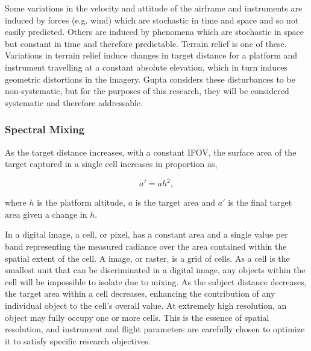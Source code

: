 \documentclass[10pt]{article}
\begin{document}
Some variations in the velocity and attitude of the airframe and instruments are induced by forces (e.g. wind) which are stochastic in time and space and so not easily predicted. Others are induced by phenomena which are stochastic in space but constant in time and therefore predictable. Terrain relief is one of these. Variations in terrain relief induce changes in target distance for a platform and instrument travelling at a constant absolute elevation, which in turn induces geometric distortions in the imagery. Gupta \cite{Gupta2018} considers these disturbances to be non-systematic, but for the purposes of this research, they will be considered systematic and therefore addressable.

\subsubsection*{Spectral Mixing}

As the target distance increases, with a constant IFOV, the surface area of the target captured in a single cell increases in proportion as, 

\begin{equation}
a\prime = a h^2,
\end{equation}

where $h$ is the platform altitude, $a$ is the target area and $a\prime$ is the final target area given a change in $h$. 

In a digital image, a cell, or pixel, has a constant area and a single value per band representing the measured radiance over the area contained within the spatial extent of the cell. A image, or raster, is a grid of cells. As a cell is the smallest unit that can be discriminated in a digital image, any objects within the cell will be impossible to isolate due to mixing. As the subject distance decreases, the target area within a cell decreases, enhancing the contribution of any individual object to the cell's overall value. At extremely high resolution, an object may fully occupy one or more cells. This is the essence of spatial resolution, and instrument and flight parameters are carefully chosen to optimize it to satisfy specific research objectives. 
\end{document}
